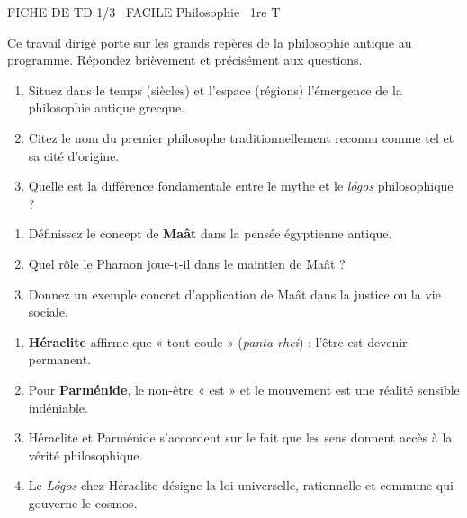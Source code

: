 \documentclass[11pt]{article}
\begin{document}
\begin{tcolorbox}[enhanced,colback=popink,colframe=popink,arc=10pt,boxrule=0pt,left=12pt,right=12pt,top=9pt,bottom=9pt]
{\color{white}\popxbold\small FICHE DE TD 1/3 \textbullet\ FACILE \hfill Philosophie \textbullet\ 1re T\par}
\end{tcolorbox}
\vspace{4pt}
Ce travail dirigé porte sur les grands repères de la philosophie antique au programme. Répondez brièvement et précisément aux questions.

\begin{exercice}
\begin{enumerate}
    \item Situez dans le temps (siècles) et l'espace (régions) l'émergence de la philosophie antique grecque.
    \item Citez le nom du premier philosophe traditionnellement reconnu comme tel et sa cité d'origine.
    \item Quelle est la différence fondamentale entre le mythe et le \emph{lógos} philosophique ?
\end{enumerate}
\end{exercice}

\begin{exercice}
\begin{enumerate}
    \item Définissez le concept de \textbf{Maât} dans la pensée égyptienne antique.
    \item Quel rôle le Pharaon joue-t-il dans le maintien de Maât ?
    \item Donnez un exemple concret d'application de Maât dans la justice ou la vie sociale.
\end{enumerate}
\end{exercice}

\begin{exercice}
\begin{enumerate}
    \item \textbf{Héraclite} affirme que « tout coule » (\emph{panta rhei}) : l'être est devenir permanent.
    \item Pour \textbf{Parménide}, le non-être « est » et le mouvement est une réalité sensible indéniable.
    \item Héraclite et Parménide s'accordent sur le fait que les sens donnent accès à la vérité philosophique.
    \item Le \emph{Lógos} chez Héraclite désigne la loi universelle, rationnelle et commune qui gouverne le cosmos.
\end{enumerate}
\end{exercice}
\end{document}
